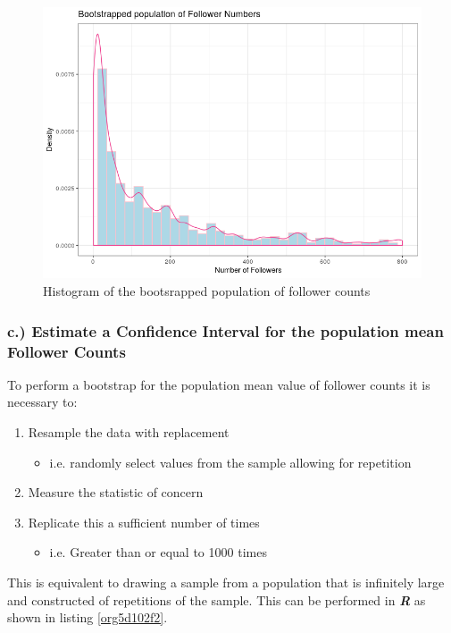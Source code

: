 \documentclass[11pt]{article}
\begin{document}
\begin{figure}[htbp]
\centering
\includegraphics[width=12cm]{./Figures/BootStrap_Pop.png}
\caption{\label{fig:org25c7a39}Histogram of the bootsrapped population of follower counts}
\end{figure}

\subsubsection{c.) Estimate a Confidence Interval for the population mean Follower Counts}
\label{sec:org8a0898e}
To perform a bootstrap for the population mean value of follower counts it is necessary to:

\begin{enumerate}
\item Resample the data with replacement
\begin{itemize}
\item i.e. randomly select values from the sample allowing for repetition
\end{itemize}
\item Measure the statistic of concern
\item Replicate this a sufficient number of times
\begin{itemize}
\item i.e. Greater than or equal to 1000 times \cite[Ch. 5]{davison1997}
\end{itemize}
\end{enumerate}

This is equivalent to drawing a sample from a population that is infinitely large and constructed of repetitions of the sample. This can be performed in \textbf{\emph{R}} as shown in listing \ref{org5d102f2}.
\end{document}
